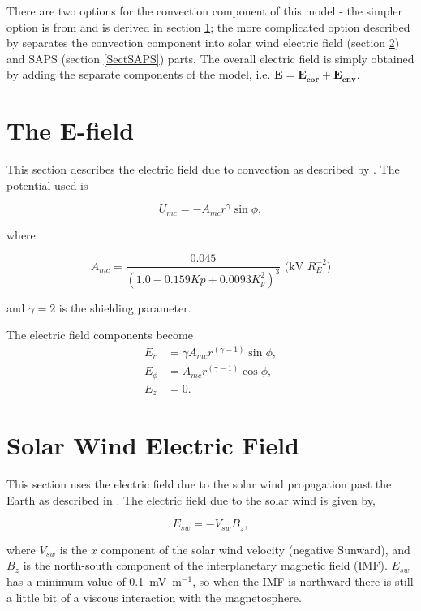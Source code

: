 \documentclass[]{article}
\begin{document}
There are two options for the convection component of this model - the simpler option is from \citet{Maynard1975} and is derived in section \ref{SectMC}; the more complicated option described by \citet{Goldstein2005} separates the convection component into solar wind electric field (section \ref{SectSW}) and SAPS (section \ref{SectSAPS}) parts. The overall electric field is simply obtained by adding the separate components of the model, i.e. $\mathbf{E} = \mathbf{E_{cor}} + \mathbf{E_{cnv}}$.


\section{The \citet{Maynard1975} $\mathbf{E}$-field}
\label{SectMC}
This section describes the electric field due to convection as described by \citet{Maynard1975}. The potential used is

\begin{equation}
	U_{mc} = -A_{mc} r^\gamma \sin{\phi}, \label{EqMCPot}
\end{equation}

where 

\begin{equation}
	A_{mc} = \frac{0.045}{(1.0 - 0.159 Kp + 0.0093 K_p^2)^3} \text{ (kV $R_E^{-2}$)}
\end{equation}

and $\gamma=2$ is the shielding parameter.

The electric field components become
\begin{align}
	E_r &= \gamma A_{mc} r^{(\gamma-1)}\sin{\phi},\\
	E_\phi &= A_{mc} r^{(\gamma-1)} \cos{\phi},\\
	E_z &= 0.
\end{align}

\section{Solar Wind Electric Field}
\label{SectSW}
This section uses the electric field due to the solar wind propagation past the Earth as described in \citet{Goldstein2005}. The electric field due to the solar wind is given by,

\begin{equation}
	E_{sw} = -V_{sw} B_z,
\end{equation}

where $V_{sw}$ is the $x$ component of the solar wind velocity (negative Sunward), and $B_z$ is the north-south component of the interplanetary magnetic field (IMF). $E_{sw}$ has a minimum value of 0.1~mV~m$^{-1}$, so when the IMF is northward there is still a little bit of a viscous interaction with the magnetosphere.
\end{document}
